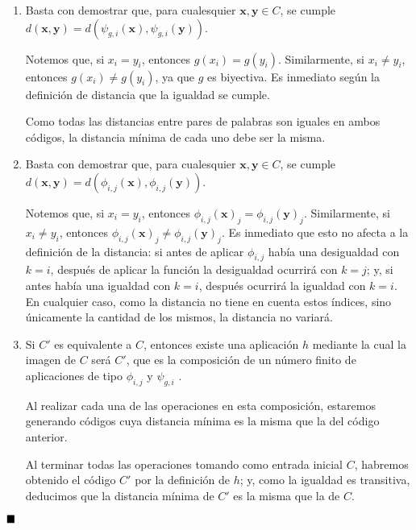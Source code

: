 \begin{enumerate}[label=\alph*)]
	\item Basta con demostrar que, para cualesquier $\textbf{x}, \textbf{y} \in C$, se cumple $d(\textbf{x}, \textbf{y}) = d(\psi_{g, i}(\textbf{x}), \psi_{g, i}(\textbf{y}))$.
	
	Notemos que, si $x_i = y_i$, entonces $g(x_i) = g(y_i)$. Similarmente, si $x_i\neq y_i$, entonces $g(x_i) \neq g(y_i)$, ya que $g$ es biyectiva. Es inmediato según la definición de distancia que la igualdad se cumple.
	
	Como todas las distancias entre pares de palabras son iguales en ambos códigos, la distancia mínima de cada uno debe ser la misma.
	
	\item Basta con demostrar que, para cualesquier $\textbf{x}, \textbf{y} \in C$, se cumple $d(\textbf{x}, \textbf{y}) = d(\phi_{i,j}(\textbf{x}), \phi_{i,j}(\textbf{y}))$.
	
	Notemos que, si $x_i = y_i$, entonces $\phi_{i,j}(\textbf{x})_j = \phi_{i,j}(\textbf{y})_j$. Similarmente, si $x_i \neq y_i$, entonces $\phi_{i,j}(\textbf{x})_j \neq \phi_{i,j}(\textbf{y})_j$. Es inmediato que esto no afecta a la definición de la distancia: si antes de aplicar $\phi_{i,j}$ había una desigualdad con $k = i$, después de aplicar la función la desigualdad ocurrirá con $k = j$; y, si antes había una igualdad con $k = i$, después ocurrirá la igualdad con $k = i$. En cualquier caso, como la distancia no tiene en cuenta estos índices, sino únicamente la cantidad de los mismos, la distancia no variará.
	
	\item Si $C'$ es equivalente a $C$, entonces existe una aplicación $h$ mediante la cual la imagen de $C$ será $C'$, que es la composición de un número finito de aplicaciones de tipo $\phi_{i,j}$ y $\psi_{g, i}$ .
	
	Al realizar cada una de las operaciones en esta composición, estaremos generando códigos cuya distancia mínima es la misma que la del código anterior.
	
	Al terminar todas las operaciones tomando como entrada inicial $C$, habremos obtenido el código $C'$ por la definición de $h$; y, como la igualdad es transitiva, deducimos que la distancia mínima de $C'$ es la misma que la de $C$.
\end{enumerate}

$\qed$


